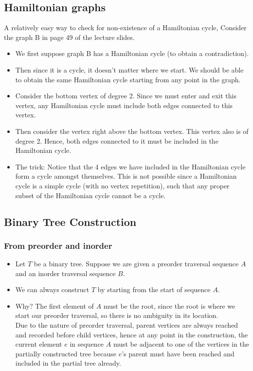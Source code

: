 \documentclass{article}
\begin{document}
\subsection{Hamiltonian graphs}
A relatively easy way to check for non-existence of a Hamiltonian cycle,
Consider the graph B in page 49 of the lecture slides.
\begin{itemize}
    \item We first suppose graph B has a Hamiltonian cycle (to obtain a contradiction).
    \item Then since it is a cycle, it doesn't matter where we start. We should be able to obtain the same Hamiltonian cycle starting from any point in the graph. 
    \item Consider the bottom vertex of degree 2. Since we must enter and exit this vertex, any Hamiltonian cycle must include both edges connected to this vertex.
    \item Then consider the vertex right above the bottom vertex. This vertex also is of degree 2. Hence, both edges connected to it must be included in the Hamiltonian cycle.
    \item The trick: Notice that the 4 edges we have included in the Hamiltonian cycle form a cycle amongst themselves. This is not possible since a Hamiltonian cycle is a simple cycle (with no vertex repetition), such that any proper subset of the Hamiltonian cycle cannot be a cycle.
\end{itemize}

\subsection{Binary Tree Construction}
\subsubsection{From preorder and inorder}
\begin{itemize}
	\item Let $T$ be a binary tree. Suppose we are given a preorder traversal sequence $A$ and an inorder traversal sequence $B$.
	\item We can always construct $T$ by starting from the start of sequence $A$.
	\item Why? The first element of $A$ must be the root, since the root is where we start our preorder traversal, so there is no ambiguity in its location.\\ 
	Due to the nature of preorder traversal, parent vertices are always reached and recorded before child vertices, hence at any point in the construction, the current element $e$ in sequence $A$ must be adjacent to one of the vertices in the partially constructed tree because $e$'s parent must have been reached and included in the partial tree already.
\end{itemize}
\end{document}
